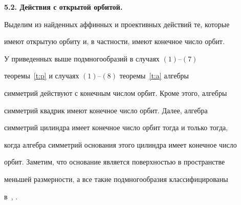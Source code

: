 {\bf 5.2. Действия с открытой орбитой.} 


Выделим из найденных аффинных и проективных действий те, которые 


имеют открытую орбиту и, в частности, имеют конечное число орбит.


 


У приведенных выше подмногообразий в случаях $(1)$--$(7)$


теоремы~\ref{t:p} и случаях $(1)$--$(8)$ теоремы~\ref{t:a} алгебры


симметрий действуют с конечным числом орбит. Кроме этого, алгебры


симметрий квадрик имеют конечное число орбит. Далее, алгебра


симметрий цилиндра имеет конечное число орбит тогда и только тогда,


когда алгебра симметрий основания этого цилиндра имеет конечное число


орбит. Заметим, что основание является поверхностью в пространстве


меньшей размерности, а все такие подмногообразия классифицированы


в~\cite{nr:nk}, \cite{dsv:1998}.








